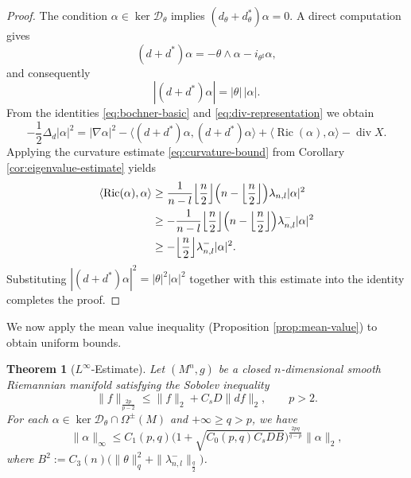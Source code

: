 \documentclass[12pt, twoside]{article}
\newtheorem{theorem}{Theorem}[section]
\theoremstyle{definition}
\numberwithin{equation}{section}
\def \la {\lambda}
\begin{document}
	\begin{proof}
		The condition \(\alpha\in\ker\mathcal{D}_{\theta}\) implies $(d_{\theta}+d^{*}_{\theta})\alpha = 0.$ 	A direct computation gives
		\[
		(d+d^{*})\alpha = -\theta\wedge\alpha - i_{\theta^{\sharp}}\alpha,
		\]
		and consequently
		\[
		|(d+d^{*})\alpha| = |\theta|\,|\alpha|.
		\]
		From the identities \eqref{eq:bochner-basic} and \eqref{eq:div-representation} we obtain
		\[
		-\frac{1}{2}\Delta_{d}|\alpha|^{2}
		= |\nabla\alpha|^{2}
		- \langle (d+d^{*})\alpha, (d+d^{*})\alpha\rangle
		+ \langle \operatorname{Ric}(\alpha), \alpha\rangle
		- \operatorname{div} X.
		\]
		Applying the curvature estimate \eqref{eq:curvature-bound} from Corollary \ref{cor:eigenvalue-estimate} yields
		\begin{align*}
		\langle \operatorname{Ric}(\alpha), \alpha \rangle
		&\ge \frac{1}{n-l}\Bigl\lfloor\frac{n}{2}\Bigr\rfloor
		\Bigl(n - \Bigl\lfloor\frac{n}{2}\Bigr\rfloor\Bigr)\lambda_{n,l}|\alpha|^{2} \\
		&\ge -\frac{1}{n-l}\Bigl\lfloor\frac{n}{2}\Bigr\rfloor
		\Bigl(n - \Bigl\lfloor\frac{n}{2}\Bigr\rfloor\Bigr)\lambda^{-}_{n,l}|\alpha|^{2} \\
		&\ge -\Bigl\lfloor\frac{n}{2}\Bigr\rfloor\lambda^{-}_{n,l}|\alpha|^{2}.
		\end{align*}
		Substituting \(|(d+d^{*})\alpha|^{2} = |\theta|^{2}|\alpha|^{2}\) together with this estimate into the identity completes the proof.
	\end{proof}
	We now apply the mean value inequality (Proposition \ref{prop:mean-value}) to obtain uniform bounds.
	
	\begin{theorem}[\(L^{\infty}\)-Estimate]\label{thm:Linfty-estimate}
		Let \((M^{n},g)\) be a closed \(n\)-dimensional smooth Riemannian manifold satisfying the Sobolev inequality
		\[
		\|f\|_{\frac{2p}{p-2}}\le\|f\|_{2}+C_{s}D\|df\|_{2},\qquad p>2.
		\]
		For each \(\alpha\in\ker\mathcal{D}_{\theta}\cap\Omega^{\pm}(M)\) and {\(+\infty\geq q>p\)}, we have
		{ \begin{equation}\label{eq:Linfty-bound-alpha}
\|\alpha\|_{\infty}
		\le C_1(p,q)\bigl(1+\sqrt{C_{0}(p,q)C_{s}DB}\bigr)^{\frac{2pq}{q-p}}\|\alpha\|_{2},
		\end{equation}	}
	where \(B^{2}:=C_3(n) \bigl(\|\theta\|_{q}^{2}+\|\la^{-}_{n,l}\|_{\frac{q}{2}}\bigr)\).
	\end{theorem}
	
\end{document}
